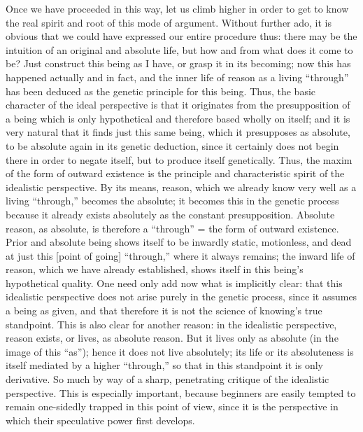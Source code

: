 Once we have proceeded in this way,
let us climb higher in order to get
to know the real spirit and root
of this mode of argument.
Without further ado,
it is obvious that we could have expressed our entire procedure thus:
there may be the intuition of an original and absolute life,
but how and from what does it come to be?
Just construct this being as I have,
or grasp it in its becoming;
now this has happened actually and in fact,
and the inner life of reason as a living “through”
has been deduced as the genetic principle for this being.
Thus, the basic character of the ideal perspective is
that it originates from the presupposition of
a being which is only hypothetical
and therefore based wholly on itself;
and it is very natural that it finds just this same being,
which it presupposes as absolute,
to be absolute again in its genetic deduction,
since it certainly does not begin there
in order to negate itself,
but to produce itself genetically.
Thus, the maxim of the form of outward existence is
the principle and characteristic spirit
of the idealistic perspective.
By its means, reason, which we already know very well
as a living “through,” becomes the absolute;
it becomes this in the genetic process
because it already exists absolutely
as the constant presupposition.
Absolute reason, as absolute, is therefore a “through” =
the form of outward existence.
Prior and absolute being shows itself to be
inwardly static, motionless, and dead
at just this [point of going] “through,”
where it always remains;
the inward life of reason,
which we have already established,
shows itself in this being's hypothetical quality.
One need only add now what is implicitly clear:
that this idealistic perspective does not arise
purely in the genetic process,
since it assumes a being as given,
and that therefore it is not
the science of knowing's true standpoint.
This is also clear for another reason:
in the idealistic perspective, reason exists,
or lives, as absolute reason.
But it lives only as absolute
(in the image of this “as”);
hence it does not live absolutely;
its life or its absoluteness is itself mediated by
a higher “through,”
so that in this standpoint it is only derivative.
So much by  way of a sharp, penetrating
critique of the idealistic perspective.
This is especially important,
because beginners are easily tempted to remain
one-sidedly trapped in this point of view,
since it is the perspective in which
their speculative power first develops.

